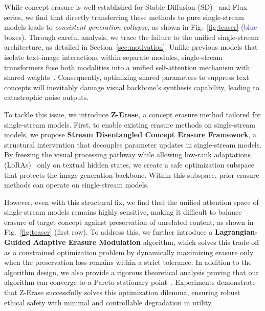 While concept erasure is well-established for Stable Diffusion (SD)~\cite{sd} and Flux~\cite{flux1kontext} series, we find that directly transferring these methods to pure single-stream models leads to \emph{consistent generation collapse}, as shown in Fig.~\ref{fig:teaser} (\textcolor{blue}{blue} boxes). Through careful analysis, we trace the failure to the unified single-stream architecture, as detailed in Section~\ref{sec:motivation}. Unlike previous models that isolate text-image interactions within separate modules, single-stream transformers fuse both modalities into a unified self-attention mechanism with shared weights~\cite{zimage}. Consequently, optimizing shared parameters to suppress text concepts will inevitably damage visual backbone's synthesis capability, leading to catastrophic noise outputs.



To tackle this issue, we introduce \textbf{Z-Erase}, a concept erasure method tailored for single-stream models. First, to enable existing erasure methods on single-stream models, we propose \textbf{Stream Disentangled Concept Erasure Framework}, a structural intervention that decouples parameter updates in single-stream models. By freezing the visual processing pathway while allowing low-rank adaptations (LoRAs)~\cite{lora} only on textual hidden states, we create a safe optimization subspace that protects the image generation backbone. Within this subspace, prior erasure methods can operate on single-stream models.

However, even with this structural fix, we find that the unified attention space of single-stream models remains highly sensitive, making it difficult to balance erasure of target concept against preservation of unrelated content, as shown in Fig.~\ref{fig:teaser} (first row). To address this, we further introduce a \textbf{Lagrangian-Guided Adaptive Erasure Modulation} algorithm, which solves this trade-off as a constrained optimization problem by dynamically maximizing erasure only when the preservation loss remains within a strict tolerance. In addition to the algorithm design, we also provide a rigorous theoretical analysis proving that our algorithm can converge to a Pareto stationary point~\cite{yu2020gradientsurgerymultitasklearning}. Experiments demonstrate that Z-Erase successfully solves this optimization dilemma, ensuring robust ethical safety with minimal and controllable degradation in utility.

